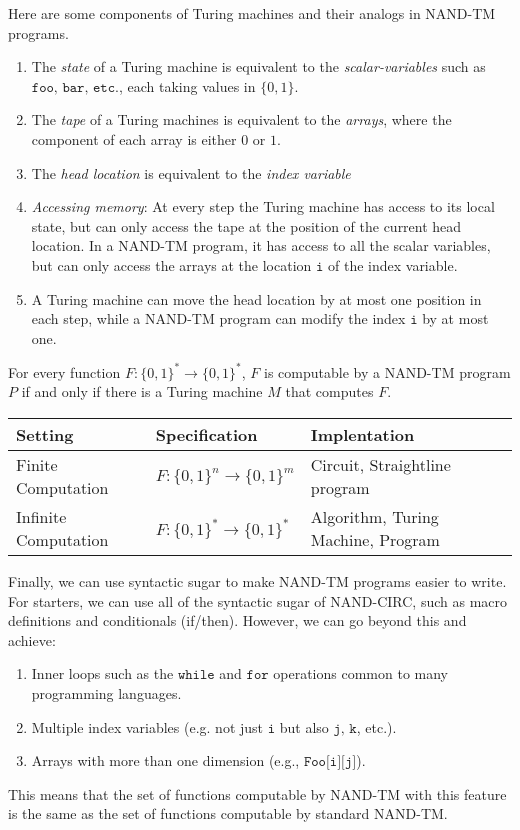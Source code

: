   Here are some components of Turing machines and their analogs in NAND-TM programs. 
  \begin{enumerate}
      \item The \textit{state} of a Turing machine is equivalent to the \textit{scalar-variables} such as $\texttt{foo, bar, etc.}$, each taking values in $\{0,1\}$. 
      \item The \textit{tape} of a Turing machines is equivalent to the \textit{arrays}, where the component of each array is either $0$ or $1$. 
      \item The \textit{head location} is equivalent to the \textit{index variable}
      \item \textit{Accessing memory}: At every step the Turing machine has access to its local state, but can only access the tape at the position of the current head location. In a NAND-TM program, it has access to all the scalar variables, but can only access the arrays at the location $\texttt{i}$ of the index variable. 
      \item A Turing machine can move the head location by at most one position in each step, while a NAND-TM program can modify the index $\texttt{i}$ by at most one. 
  \end{enumerate}

  \begin{theorem}
  For every function $F: \{0,1\}^* \longrightarrow \{0,1\}^*$, $F$ is computable by a NAND-TM program $P$ if and only if there is a Turing machine $M$ that computes $F$. 
  \end{theorem}

  \begin{center}
  \begin{tabular}{l|l|l}
      Setting & Specification & Implentation \\
      \hline
      Finite Computation& $F: \{0,1\}^n \rightarrow \{0,1\}^m$ & Circuit, Straightline program \\
      Infinite Computation & $F: \{0,1\}^* \rightarrow \{0,1\}^*$ & Algorithm, Turing Machine, Program
  \end{tabular}
  \end{center}

  Finally, we can use syntactic sugar to make NAND-TM programs easier to write. For starters, we can use all of the syntactic sugar of NAND-CIRC, such as macro definitions and conditionals (if/then). However, we can go beyond this and achieve: 
  \begin{enumerate}
      \item Inner loops such as the $\texttt{while}$ and $\texttt{for}$ operations common to many programming languages. 
      \item Multiple index variables (e.g. not just $\texttt{i}$ but also $\texttt{j, k}$, etc.). 
      \item Arrays with more than one dimension (e.g., $\texttt{Foo[i][j]}$). 
  \end{enumerate}
  This means that the set of functions computable by NAND-TM with this feature is the same as the set of functions computable by standard NAND-TM.

